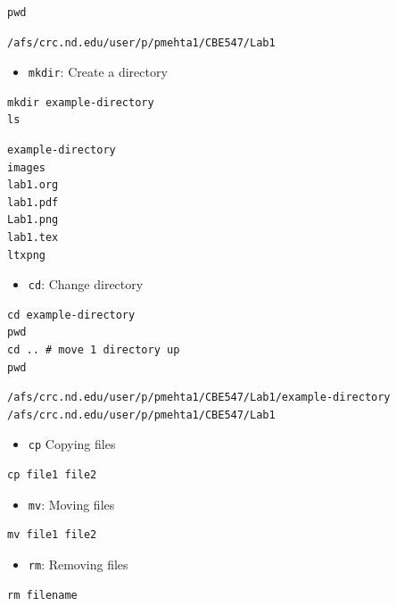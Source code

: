 \documentclass[11pt]{article}
\begin{document}
\begin{verbatim}
pwd
\end{verbatim}

\begin{verbatim}
/afs/crc.nd.edu/user/p/pmehta1/CBE547/Lab1
\end{verbatim}

\begin{itemize}
\item \verb~mkdir~: Create a directory
\end{itemize}

\begin{verbatim}
mkdir example-directory
ls
\end{verbatim}

\begin{verbatim}
example-directory
images
lab1.org
lab1.pdf
Lab1.png
lab1.tex
ltxpng
\end{verbatim}

\begin{itemize}
\item \verb~cd~: Change directory
\end{itemize}

\begin{verbatim}
cd example-directory
pwd
cd .. # move 1 directory up
pwd
\end{verbatim}

\begin{verbatim}
/afs/crc.nd.edu/user/p/pmehta1/CBE547/Lab1/example-directory
/afs/crc.nd.edu/user/p/pmehta1/CBE547/Lab1
\end{verbatim}

\begin{itemize}
\item \verb~cp~ Copying files
\end{itemize}
\begin{verbatim}
cp file1 file2
\end{verbatim}


\begin{itemize}
\item \verb~mv~: Moving files
\end{itemize}
\begin{verbatim}
mv file1 file2
\end{verbatim}

\begin{itemize}
\item \verb~rm~: Removing files
\end{itemize}
\begin{verbatim}
rm filename
\end{verbatim}
\end{document}
